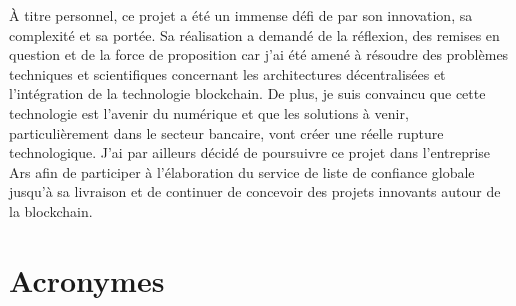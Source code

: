 \documentclass{tnreport}
\begin{document}
À titre personnel, ce projet a été un immense défi de par son innovation, sa complexité et sa portée. Sa réalisation a demandé de la réflexion, des remises en question et de la force de proposition car j'ai été amené à résoudre des problèmes techniques et scientifiques concernant les architectures décentralisées et l'intégration de la technologie blockchain.
De plus, je suis convaincu que cette technologie est l’avenir du numérique et que les solutions à venir, particulièrement dans le secteur bancaire, vont créer une réelle rupture technologique.
J’ai par ailleurs décidé de poursuivre ce projet dans l'entreprise Ar{\texteta}s afin de participer à l'élaboration du service de liste de confiance globale jusqu'à sa livraison et de continuer de concevoir des projets innovants autour de la blockchain.

\cleardoublepage
\renewcommand{\tocbibname}{Bibliographie / Webographie}


\listoffigures

\lstlistoflistings

\chapter*{Acronymes}
\end{document}

